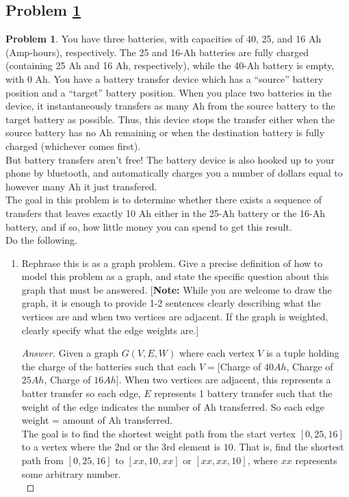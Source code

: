 \documentclass[11pt]{article}
\theoremstyle{definition}
\theoremstyle{definition}
\newtheorem{required}{Problem}
\theoremstyle{definition}
\begin{document}
\subsection{Problem \ref{Dijkstra2}} 
\begin{required} \label{Dijkstra2}
You have three batteries, with capacities of 40, 25, and 16 Ah (Amp-hours), respectively. The 25 and 16-Ah batteries are fully charged (containing 25 Ah and 16 Ah, respectively), while the 40-Ah battery is empty, with 0 Ah. You have a battery transfer device which has a ``source'' battery position and a ``target'' battery position. When you place two batteries in the device, it instantaneously transfers as many Ah from the source battery to the target battery as possible. Thus, this device stops the transfer either when the source battery has no Ah remaining or when the destination battery is fully charged (whichever comes first).  \\

\noindent But battery transfers aren't free! The battery device is also hooked up to your phone by bluetooth, and automatically charges you a number of dollars equal to however many Ah it just transfered.  \\
	
\noindent The goal in this problem is to determine whether there exists a sequence of transfers that leaves exactly 10 Ah either in the 25-Ah battery or the 16-Ah battery, and if so, how little money you can spend to get this result. \\

\noindent Do the following.
\begin{enumerate}[label=(\alph*)]
\subsubsection{Problem 6\ref{Dijkstra2a}}
\item \label{Dijkstra2a} Rephrase this is as a graph problem. Give a precise definition of how to model this problem as a graph, and state the specific question about this graph that must be answered. [\textbf{Note:} While you are welcome to draw the graph, it is enough to provide 1-2 sentences clearly describing what the vertices are and when two vertices are adjacent. If the graph is weighted, clearly specify what the edge weights are.]

\begin{proof}[Answer]
Given a graph $G(V, E, W)$ where each vertex $V$ is a tuple holding the charge of the batteries such that each $V= [$Charge of $40Ah$, Charge of $25Ah$, Charge of $16Ah]$. When two vertices are adjacent, this represents a batter transfer so each edge, $E$ represents 1 battery transfer such that the weight of the edge indicates the number of Ah transferred. So each edge weight = amount of Ah transferred. \\
The goal is to find the shortest weight path from the start vertex $[0,25,16]$ to a vertex where the 2nd or the 3rd element is $10$. That is, find the shortest path from $[0,25,16]$ to  $[xx, 10, xx]$ or $[xx,xx,10]$, where $xx$ represents some arbitrary number. \\


\end{proof}
\end{enumerate}
\end{required}
\end{document}
